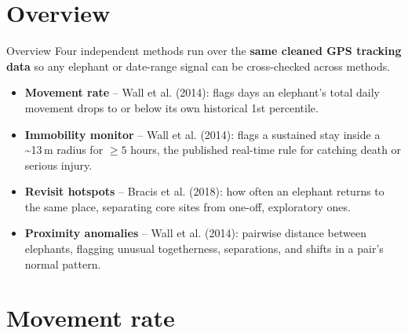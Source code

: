 \documentclass{beamer}
\newcommand{\hi}[1]{\textbf{\textcolor{hicolor}{#1}}}
\begin{document}
	\section{Overview}
	\begin{frame}{Overview}
		\small
		Four independent methods run over the \hi{same cleaned GPS tracking data}
		so any elephant or date-range signal can be cross-checked across methods.
		\vspace{0.6em}
		\begin{itemize}
			\setlength{\itemsep}{5pt}
			\item \textbf{Movement rate} -- Wall et al. (2014): flags days an elephant's
			total daily movement drops to or below its own historical 1st percentile.
			\item \textbf{Immobility monitor} -- Wall et al. (2014): flags a sustained
			stay inside a \textasciitilde13\,m radius for $\geq 5$ hours, the published
			real-time rule for catching death or serious injury.
			\item \textbf{Revisit hotspots} -- Bracis et al. (2018): how often an elephant
			returns to the same place, separating core sites from one-off, exploratory ones.
			\item \textbf{Proximity anomalies} -- Wall et al. (2014): pairwise distance
			between elephants, flagging unusual togetherness, separations, and shifts in
			a pair's normal pattern.
		\end{itemize}
	\end{frame}
	
	
	\section{Movement rate}
	
\end{document}
